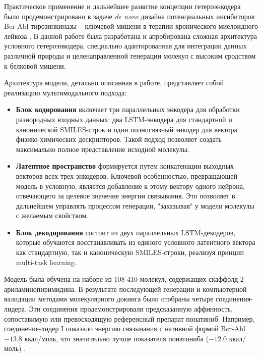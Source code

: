 
Практическое применение и дальнейшее развитие концепции гетероэнкодера было продемонстрировано в задаче \textit{de novo} дизайна потенциальных ингибиторов Bcr-Abl тирозинкиназы -- ключевой мишени в терапии хронического миелоидного лейкоза \cite{карпенко2023генеративная}. В данной работе была разработана и апробирована сложная архитектура условного гетероэнкодера, специально адаптированная для интеграции данных различной природы и целенаправленной генерации молекул с высоким сродством к белковой мишени.

Архитектура модели, детально описанная в работе, представляет собой реализацию мультимодального подхода:
\begin{itemize}
	\item \textbf{Блок кодирования} включает три параллельных энкодера для обработки разнородных входных данных: два LSTM-энкодера для стандартной и канонической SMILES-строк и один полносвязный энкодер для вектора физико-химических дескрипторов. Такой подход позволяет создать максимально полное представление исходной молекулы.

	\item \textbf{Латентное пространство} формируется путем конкатенации выходных векторов всех трех энкодеров. Ключевой особенностью, превращающей модель в условную, является добавление к этому вектору одного нейрона, отвечающего за целевое значение энергии связывания. Это позволяет в дальнейшем управлять процессом генерации, "заказывая" у модели молекулы с желаемым свойством.

	\item \textbf{Блок декодирования} состоит из двух параллельных LSTM-декодеров, которые обучаются восстанавливать из единого условного латентного вектора как стандартную, так и каноническую SMILES-строки, реализуя принцип multi-task learning.
\end{itemize}

Модель была обучена на наборе из 108 410 молекул, содержащих скаффолд 2-ариламинопиримидина. В результате последующей генерации и компьютерной валидации методами молекулярного докинга были отобраны четыре соединения-лидера. Эти соединения продемонстрировали предсказанную аффинность, сопоставимую или превосходящую референсный препарат понатиниб. Например, соединение-лидер I показало энергию связывания с нативной формой Bcr-Abl $-13.8$ ккал/моль, что значительно лучше показателя понатиниба ($-12.0$ ккал/моль) \cite{карпенко2023генеративная}.


